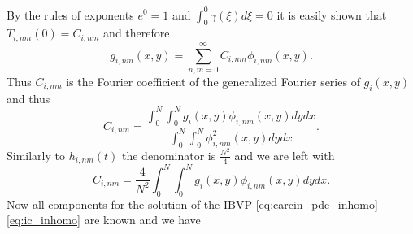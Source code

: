 \documentclass[\main/thesis.tex]{subfiles}
\begin{document}
By the rules of exponents $e^0 {=} 1$ and $\int_{0}^{0} \gamma(\xi) d\xi {=} 0$ it is easily shown that $T_{i,nm}(0) {=} C_{i,nm}$ and therefore
\begin{equation*}
g_{i,nm}(x, y) {=} \sum_{n,m{=}0}^{\infty} C_{i,nm} \phi_{i,nm}(x, y).
\end{equation*}
Thus $C_{i,nm}$ is the Fourier coefficient of the generalized Fourier series of $g_i(x, y)$ and thus
\begin{equation*}
C_{i,nm} {=} \frac{\int_{0}^{N} \int_{0}^{N} g_i(x, y) \phi_{i,nm}(x, y) dy dx}{\int_{0}^{N} \int_{0}^{N} \phi_{i,nm}^2(x, y) dy dx}.
\end{equation*}
Similarly to $h_{i,nm}(t)$ the denominator is $\frac{N^2}{4}$ and we are left with
\begin{equation}
C_{i,nm} {=} \frac{4}{N^2} \int_{0}^{N} \int_{0}^{N} g_i(x, y) \phi_{i,nm}(x, y) dy dx.
\label{eq:fourier_coeff_g}
\end{equation}
Now all components for the solution of the IBVP \eqref{eq:carcin_pde_inhomo}-\eqref{eq:ic_inhomo} are known and we have
\end{document}
